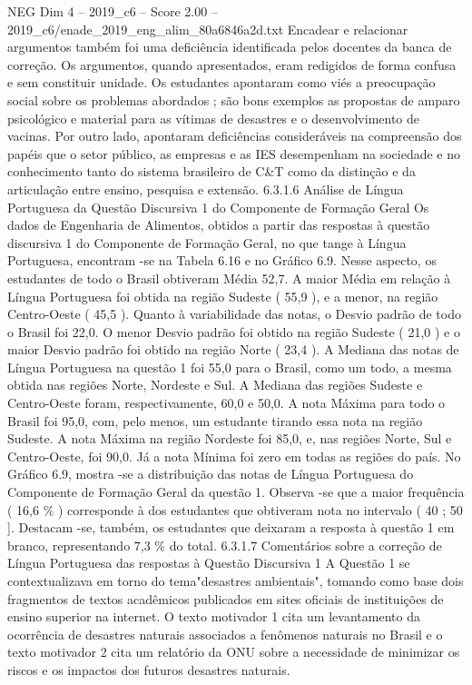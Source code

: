 \begin{textsample}{NEG Dim 4 – 2019\_c6 – Score 2.00 – 2019\_c6/enade\_2019\_eng\_alim\_80a6846a2d.txt}
Encadear e relacionar argumentos também foi uma deficiência identificada pelos docentes da banca de correção.
Os argumentos, quando apresentados, eram redigidos de forma confusa e sem constituir unidade.
Os estudantes apontaram como viés a preocupação social sobre os problemas abordados ; são bons exemplos as propostas de amparo psicológico e material para as vítimas de desastres e o desenvolvimento de vacinas.
Por outro lado, apontaram deficiências consideráveis na compreensão dos papéis que o setor público, as empresas e as IES desempenham na sociedade e no conhecimento tanto do sistema brasileiro de C\&T como da distinção e da articulação entre ensino, pesquisa e extensão. 6.3.1.6 Análise de Língua Portuguesa da Questão Discursiva 1 do Componente de Formação Geral Os dados de Engenharia de Alimentos, obtidos a partir das respostas à questão discursiva 1 do Componente de Formação Geral, no que tange à Língua Portuguesa, encontram -se na Tabela 6.16 e no Gráfico 6.9.
Nesse aspecto, os estudantes de todo o Brasil obtiveram Média 52,7.
A maior Média em relação à Língua Portuguesa foi obtida na região Sudeste ( 55,9 ), e a menor, na região Centro-Oeste ( 45,5 ).
Quanto à variabilidade das notas, o Desvio padrão de todo o Brasil foi 22,0.
O menor Desvio padrão foi obtido na região Sudeste ( 21,0 ) e o maior Desvio padrão foi obtido na região Norte ( 23,4 ).
A Mediana das notas de Língua Portuguesa na questão 1 foi 55,0 para o Brasil, como um todo, a mesma obtida nas regiões Norte, Nordeste e Sul.
A Mediana das regiões Sudeste e Centro-Oeste foram, respectivamente, 60,0 e 50,0.
A nota Máxima para todo o Brasil foi 95,0, com, pelo menos, um estudante tirando essa nota na região Sudeste.
A nota Máxima na região Nordeste foi 85,0, e, nas regiões Norte, Sul e Centro-Oeste, foi 90,0.
Já a nota Mínima foi zero em todas as regiões do país.
No Gráfico 6.9, mostra -se a distribuição das notas de Língua Portuguesa do Componente de Formação Geral da questão 1.
Observa -se que a maior frequência ( 16,6 \% ) corresponde à dos estudantes que obtiveram nota no intervalo ( 40 ; 50 ].
Destacam -se, também, os estudantes que deixaram a resposta à questão 1 em branco, representando 7,3 \% do total. 6.3.1.7 Comentários sobre a correção de Língua Portuguesa das respostas à Questão Discursiva 1 A Questão 1 se contextualizava em torno do tema"desastres ambientais", tomando como base dois fragmentos de textos acadêmicos publicados em sites oficiais de instituições de ensino superior na internet.
O texto motivador 1 cita um levantamento da ocorrência de desastres naturais associados a fenômenos naturais no Brasil e o texto motivador 2 cita um relatório da ONU sobre a necessidade de minimizar os riscos e os impactos dos futuros desastres naturais.

\end{textsample}
